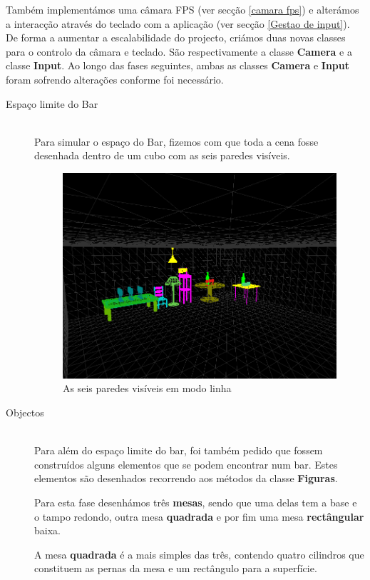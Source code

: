 \documentclass[a5paper,onecolumn, 11pt]{article}
\begin{document}
Também implementámos uma câmara FPS (ver secção \ref{camara fps}) e alterámos a interacção através do teclado com a aplicação (ver secção \ref{Gestao de input}). De forma a aumentar a escalabilidade do projecto, criámos duas novas classes para o controlo da câmara e teclado. São respectivamente a classe \textbf{Camera} e a classe \textbf{Input}. Ao longo das fases seguintes, ambas as classes \textbf{Camera} e \textbf{Input} foram sofrendo alterações conforme foi necessário.
\newpage
\begin{description}
	\item[Espaço limite do Bar] \hfill \\
	Para simular o espaço do Bar, fizemos com que toda a cena fosse desenhada dentro de um cubo com as seis paredes visíveis.
\begin{figure}[h!b!t!]
	\centering
	\includegraphics[scale=0.4]{paredes.png}
	\caption{As seis paredes visíveis em modo linha}
\end{figure}
\newpage
\item[Objectos] \hfill \\
Para além do espaço limite do bar, foi também pedido que fossem construídos alguns elementos que se podem encontrar num bar. Estes elementos são desenhados recorrendo aos métodos da classe \textbf{Figuras}.

Para esta fase desenhámos três \textbf{mesas}, sendo que uma delas tem a base e o tampo redondo, outra mesa \textbf{quadrada} e por fim uma mesa \textbf{rectângular} baixa.

A mesa \textbf{quadrada} é a mais simples das três, contendo quatro cilindros que constituem as pernas da mesa e um rectângulo para a superfície.


\end{description}
\end{document}
